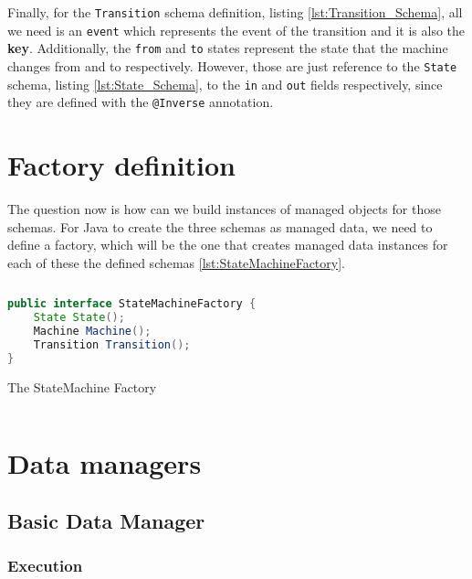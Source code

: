 Finally, for the \texttt{Transition} schema definition, listing \ref{lst:Transition_Schema}, all we need is an \texttt{event} which represents the event of the transition and it is also the \textbf{key}.
Additionally, the \texttt{from} and \texttt{to} states represent the state that the machine changes from and to respectively.
However, those are just reference to the \texttt{State} schema, listing \ref{lst:State_Schema}, to the \texttt{in} and \texttt{out} fields respectively, since they are defined with the \texttt{@Inverse} annotation.

\section{Factory definition}
The question now is how can we build instances of managed objects for those schemas. For Java to create the three schemas as managed data, we need to define a factory, which will be the one that creates managed data instances for each of these the defined schemas \ref{lst:StateMachineFactory}.

\begin{sourcecode}[H]
	\begin{lstlisting}[language=Java]
public interface StateMachineFactory {
    State State();
    Machine Machine();
    Transition Transition();
}
	\end{lstlisting}
	\caption{The StateMachine Factory}
	\label{lst:StateMachineFactory}
\end{sourcecode}

\section{Data managers}

\subsection{Basic Data Manager}

\subsubsection{Execution}

